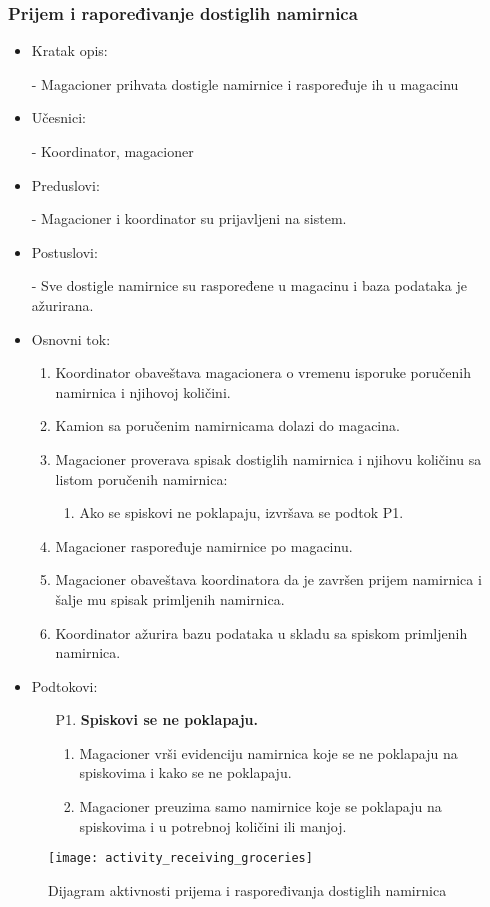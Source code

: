 
\subsubsection{Prijem i rapoređivanje dostiglih namirnica}

	\begin{itemize}
		\item{Kratak opis:} 
		
		- Magacioner prihvata dostigle namirnice i raspoređuje ih u magacinu
		\item{Učesnici:} 
		
		- Koordinator, magacioner
		\item{Preduslovi:}
		
		- Magacioner i koordinator su prijavljeni na sistem.
		\item{Postuslovi:}
		
		- Sve dostigle namirnice su raspoređene u magacinu i baza podataka je ažurirana.
		\item{Osnovni tok:}
		\begin{enumerate}
			\item{Koordinator obaveštava magacionera o vremenu isporuke poručenih namirnica i njihovoj količini.}
			\item{Kamion sa poručenim namirnicama dolazi do magacina.}
			\item{Magacioner proverava spisak dostiglih namirnica i njihovu količinu sa listom poručenih namirnica:}
			\begin{enumerate}
			\item{Ako se spiskovi ne poklapaju, izvršava se podtok P1.}
			\end{enumerate}
			\item{Magacioner raspoređuje namirnice po magacinu.}
			\item{Magacioner obaveštava koordinatora da je završen prijem namirnica i šalje mu spisak primljenih namirnica.}
			\item{Koordinator ažurira bazu podataka u skladu sa spiskom primljenih namirnica.}
		\end{enumerate}
		
		\item{Podtokovi:}
			\begin{enumerate}
				\item[P1.] \textbf{Spiskovi se ne poklapaju.} 
				\begin{enumerate}
				\item{Magacioner vrši evidenciju namirnica koje se ne poklapaju na spiskovima i kako se ne poklapaju.}
				\item{Magacioner preuzima samo namirnice koje se poklapaju na spiskovima i u potrebnoj količini ili manjoj.}
				\end{enumerate}
			\end{enumerate}
	\end{itemize}
\begin{figure}[H]
	\begin{center}
		\texttt{[image: activity\_receiving\_groceries]}
		\caption{Dijagram aktivnosti prijema i raspoređivanja dostiglih namirnica}
	\end{center}
\end{figure}
